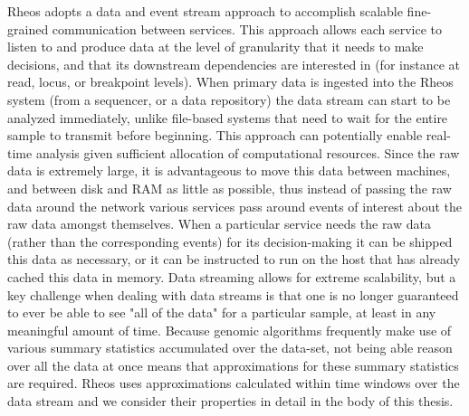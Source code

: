 Rheos adopts a data and event stream approach to accomplish scalable fine-grained communication between services\autocite{muthukrishnan2005data}. This approach allows each service to listen to and produce data at the level of granularity that it needs to make decisions, and that its downstream dependencies are interested in (for instance at read, locus, or breakpoint levels). When primary data is ingested into the Rheos system (from a sequencer, or a data repository) the data stream can start to be analyzed immediately\autocite{han2011data}, unlike file-based systems that need to wait for the entire sample to transmit before beginning. This approach can potentially enable real-time analysis given sufficient allocation of computational resources\autocite{aggarwal2007data}. Since the raw data is extremely large, it is advantageous to move this data between machines, and between disk and RAM as little as possible, thus instead of passing the raw data around the network various services pass around events of interest about the raw data amongst themselves\autocite{etzion2011event}. When a particular service needs the raw data (rather than the corresponding events) for its decision-making it can be shipped this data as necessary, or it can be instructed to run on the host that has already cached this data in memory. Data streaming allows for extreme scalability, but a key challenge when dealing with data streams is that one is no longer guaranteed to ever be able to see "all of the data" for a particular sample, at least in any meaningful amount of time\autocite{gaber2005mining}. Because genomic algorithms frequently make use of various summary statistics accumulated over the data-set\autocite{patel2012ngs,li2013aligning}, not being able reason over all the data at once means that approximations for these summary statistics are required. Rheos uses approximations calculated within time windows over the data stream\autocite{datar2002maintaining,babcock2002models} and we consider their properties in detail in the body of this thesis.

